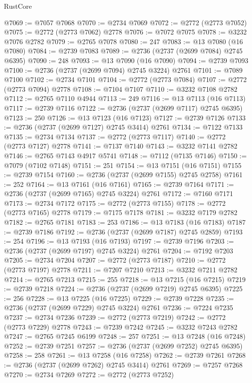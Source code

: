 \begin{lexlean}{RustCore}
\begin{coremodule}
@7069 := @7057 @7068
@7070 := @2734 @7069
@7072 := @2772 (@2773 @7052)
@7075 := @2772 (@2773 @7062) @2778
@7076 := @7072 @7075
@7078 := @3232 @7076 @2782
@7079 := @2765 @7078
@7080 := 247
@7083 := @13 @7080 (@16 @7080)
@7084 := @2739 @7083
@7089 := @2736 (@2737 (@2699 @7084) @2745 @6395)
@7090 := 248
@7093 := @13 @7090 (@16 @7090)
@7094 := @2739 @7093
@7100 := @2736 (@2737 (@2699 @7094) @2745 @3224) @2761
@7101 := @7089 @7100
@7102 := @2734 @7101
@7104 := @2772 (@2773 @7084)
@7107 := @2772 (@2773 @7094) @2778
@7108 := @7104 @7107
@7110 := @3232 @7108 @2782
@7112 := @2765 @7110 @4944
@7113 := 249
@7116 := @13 @7113 (@16 @7113)
@7117 := @2739 @7116
@7122 := @2736 (@2737 (@2699 @7117) @2745 @6395)
@7123 := 250
@7126 := @13 @7123 (@16 @7123)
@7127 := @2739 @7126
@7133 := @2736 (@2737 (@2699 @7127) @2745 @3414) @2761
@7134 := @7122 @7133
@7135 := @2734 @7134
@7137 := @2772 (@2773 @7117)
@7140 := @2772 (@2773 @7127) @2778
@7141 := @7137 @7140
@7143 := @3232 @7141 @2782
@7146 := @2765 @7143 @4917 @5741
@7148 := @7112 (@7135 @7146)
@7150 := @7079 (@7102 @7148)
@7151 := 251
@7154 := @13 @7151 (@16 @7151)
@7155 := @2739 @7154
@7160 := @2736 (@2737 (@2699 @7155) @2745 @2758)
@7161 := 252
@7164 := @13 @7161 (@16 @7161)
@7165 := @2739 @7164
@7171 := @2736 (@2737 (@2699 @7165) @2745 @3224) @2761
@7172 := @7160 @7171
@7173 := @2734 @7172
@7175 := @2772 (@2773 @7155)
@7178 := @2772 (@2773 @7165) @2778
@7179 := @7175 @7178
@7181 := @3232 @7179 @2782
@7182 := @2765 @7181
@7183 := 253
@7186 := @13 @7183 (@16 @7183)
@7187 := @2739 @7186
@7192 := @2736 (@2737 (@2699 @7187) @2745 @2859)
@7193 := 254
@7196 := @13 @7193 (@16 @7193)
@7197 := @2739 @7196
@7203 := @2736 (@2737 (@2699 @7197) @2745 @3224) @2761
@7204 := @7192 @7203
@7205 := @2734 @7204
@7207 := @2772 (@2773 @7187)
@7210 := @2772 (@2773 @7197) @2778
@7211 := @7207 @7210
@7213 := @3232 @7211 @2782
@7214 := @2765 @7213
@7215 := 255
@7218 := @13 @7215 (@16 @7215)
@7219 := @2739 @7218
@7224 := @2736 (@2737 (@2699 @7219) @2745 @6395)
@7225 := 256
@7228 := @13 @7225 (@16 @7225)
@7229 := @2739 @7228
@7235 := @2736 (@2737 (@2699 @7229) @2745 @3224) @2761
@7236 := @7224 @7235
@7237 := @2734 @7236
@7239 := @2772 (@2773 @7219)
@7242 := @2772 (@2773 @7229) @2778
@7243 := @7239 @7242
@7245 := @3232 @7243 @2782
@7247 := @2765 @7245 @6199
@7248 := 257
@7251 := @13 @7248 (@16 @7248)
@7252 := @2739 @7251
@7257 := @2736 (@2737 (@2699 @7252) @2745 @6395)
@7258 := 258
@7261 := @13 @7258 (@16 @7258)
@7262 := @2739 @7261
@7268 := @2736 (@2737 (@2699 @7262) @2745 @3414) @2761
@7269 := @7257 @7268
@7270 := @2734 @7269
@7272 := @2772 (@2773 @7252)

\end{coremodule}
\end{lexlean}
